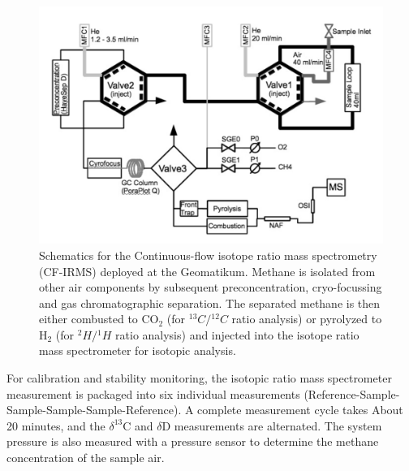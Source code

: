 \begin{figure}[htbp]
 \centering
 \includegraphics[width=1\textwidth]{figures/Methode/CF-IRMS_schematics.png}
 \caption[CF-IRMS schematics]{Schematics for the Continuous-flow isotope ratio mass spectrometry (CF-IRMS) deployed at the Geomatikum. Methane is isolated from other air components by subsequent preconcentration, cryo-focussing and gas chromatographic separation. The separated methane is then either combusted to CO$_2$ (for ${^{13}C}/{^{12}C}$ ratio analysis) or pyrolyzed to H$_2$ (for ${^{2}H}/{^{1}H}$ ratio analysis) and injected into the isotope ratio mass spectrometer for isotopic analysis. \cite{Brass.2010}}
 \label{CFIRMSSschematics}
\end{figure}
For calibration and stability monitoring, the isotopic ratio mass spectrometer measurement is packaged into six individual measurements (Reference-Sample-Sample-Sample-Sample-Reference). A complete measurement cycle takes About 20 minutes, and the $\delta ^{13}$C and $\delta$D measurements are alternated. The system pressure is also measured with a pressure sensor to determine the methane concentration of the sample air.

